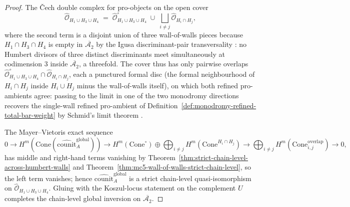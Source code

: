 \begin{proof}
The \v{C}ech double complex for pro-objects
\cite[\S 5.8]{BeilinsonDrinfeld2004} on the open cover
\[
\widehat{\mathcal{O}}_{H_1\cup H_3\cup H_4}
\;=\;
\widehat{\mathcal{O}}^{\circ}_{H_1\cup H_3\cup H_4}
\;\cup\;
\bigsqcup_{i\neq j}\widehat{\mathcal{O}}_{H_i\cap H_j},
\]
where the second term is a disjoint union of three wall-of-walls
pieces because $H_1\cap H_3\cap H_4$ is empty in
$\overline{\mathcal{A}_2}$ by the Igusa discriminant-pair
transversality \cite[\S 4]{Igusa1972TheoremsOnSiegel}: no Humbert
divisors of three distinct discriminants meet simultaneously at
codimension $3$ inside $\overline{\mathcal{A}_2}$, a threefold. The
cover thus has only pairwise overlaps
$\widehat{\mathcal{O}}^{\circ}_{H_1\cup H_3\cup H_4}
\cap
\widehat{\mathcal{O}}_{H_i\cap H_j}$, each a punctured formal disc
(the formal neighbourhood of $H_i\cap H_j$ inside $H_i\cup H_j$ minus
the wall-of-walls itself), on which both refined pro-ambients agree:
passing to the limit in one of the two monodromy directions recovers
the single-wall refined pro-ambient of
Definition~\textup{\ref{def:monodromy-refined-total-bar-weight}} by
Schmid's limit theorem \cite[\S 5]{Schmid1973}.

The Mayer--Vietoris exact sequence
\[
0 \to
H^m(\mathrm{Cone}(\widehat{\mathrm{counit}}^{\mathrm{global}}_A))
\to
H^m(\mathrm{Cone}^{\circ})
\oplus
\bigoplus_{i\neq j} H^m(\mathrm{Cone}^{H_i\cap H_j})
\to
\bigoplus_{i\neq j} H^m(\mathrm{Cone}^{\mathrm{overlap}}_{i,j})
\to 0,
\]
has middle and right-hand terms vanishing by
Theorem~\textup{\ref{thm:strict-chain-level-across-humbert-walls}}
and Theorem~\textup{\ref{thm:mc5-wall-of-walls-strict-chain-level}},
so the left term vanishes; hence
$\widehat{\mathrm{counit}}^{\mathrm{global}}_A$ is a strict chain-level
quasi-isomorphism on $\widehat{\mathcal{O}}_{H_1\cup H_3\cup H_4}$.
Gluing with the Koszul-locus statement on the complement $U$ completes
the chain-level global inversion on $\overline{\mathcal{A}_2}$.
\end{proof}

